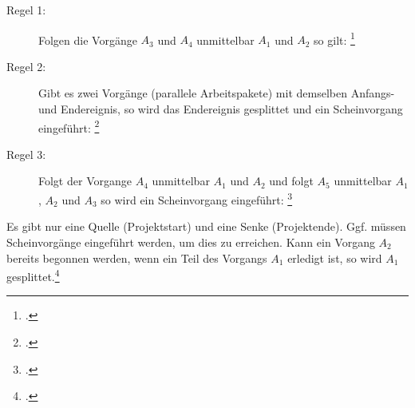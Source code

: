 \documentclass{bschlangaul-theorie}
\begin{document}
\begin{description}

\item[Regel 1:] Folgen die Vorgänge $A_3$ und $A_4$ unmittelbar $A_1$
und $A_2$ so gilt:
\footcite[Seite 24]{sosy:fs:3}

\begin{center}
\end{center}

\item[Regel 2:] Gibt es zwei Vorgänge (parallele Arbeitspakete) mit
demselben Anfangs- und Endereignis, so wird das Endereignis gesplittet
und ein Scheinvorgang eingeführt:
\footcite[Seite 25]{sosy:fs:3}

\begin{center}
\end{center}

\item[Regel 3:] Folgt der Vorgange $A_4$ unmittelbar $A_1$ und $A_2$ und
folgt $A_5$ unmittelbar $A_1$ , $A_2$ und $A_3$ so wird ein
Scheinvorgang eingeführt:
\footcite[Seite 26]{sosy:fs:3}
\end{description}

\begin{center}
\end{center}

\noindent
Es gibt nur eine Quelle (Projektstart) und eine Senke (Projektende).
Ggf. müssen Scheinvorgänge eingeführt werden, um dies zu erreichen.
%
Kann ein Vorgang $A_2$ bereits begonnen werden, wenn ein Teil des
Vorgangs $A_1$ erledigt ist, so wird $A_1$ gesplittet.\footcite[Seite
27]{sosy:fs:3}

\literatur
\end{document}
